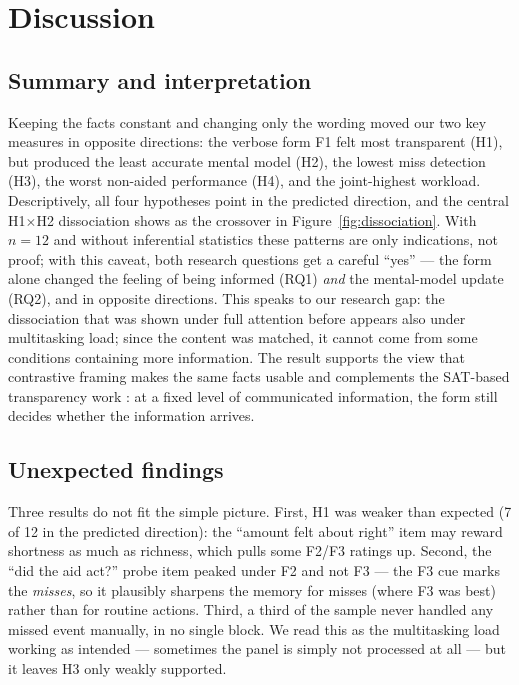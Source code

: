 \documentclass[10pt,twocolumn]{article}
\begin{document}
\section{Discussion}

\subsection{Summary and interpretation}
Keeping the facts constant and changing only the wording moved our two key measures in opposite directions: the verbose form F1 felt most transparent (H1), but produced the least accurate mental model (H2), the lowest miss detection (H3), the worst non-aided performance (H4), and the joint-highest workload. Descriptively, all four hypotheses point in the predicted direction, and the central H1$\times$H2 dissociation shows as the crossover in Figure~\ref{fig:dissociation}. With $n = 12$ and without inferential statistics these patterns are only indications, not proof; with this caveat, both research questions get a careful ``yes'' --- the form alone changed the feeling of being informed (RQ1) \textit{and} the mental-model update (RQ2), and in opposite directions. This speaks to our research gap: the dissociation that was shown under full attention before \parencite{Bansal2021,WangYin2021} appears also under multitasking load; since the content was matched, it cannot come from some conditions containing more information. The result supports the view that contrastive framing makes the same facts usable \parencite{Miller2019} and complements the SAT-based transparency work \parencite{Chen2014,Mercado2016,Stowers2017}: at a fixed level of communicated information, the form still decides whether the information arrives.

\subsection{Unexpected findings}
Three results do not fit the simple picture. First, H1 was weaker than expected (7 of 12 in the predicted direction): the ``amount felt about right'' item may reward shortness as much as richness, which pulls some F2/F3 ratings up. Second, the ``did the aid act?'' probe item peaked under F2 and not F3 --- the F3 cue marks the \textit{misses}, so it plausibly sharpens the memory for misses (where F3 was best) rather than for routine actions. Third, a third of the sample never handled any missed event manually, in no single block. We read this as the multitasking load working as intended --- sometimes the panel is simply not processed at all --- but it leaves H3 only weakly supported.
\end{document}
